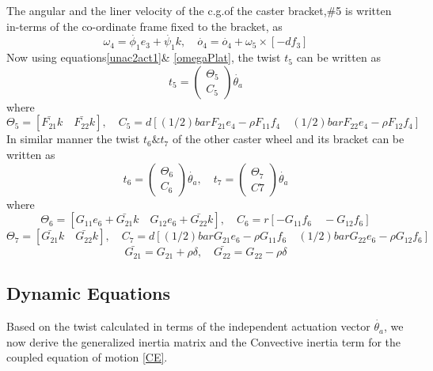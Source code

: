 The angular and the liner velocity of the c.g.of the caster bracket,\#5 is  written in-terms of the co-ordinate frame fixed to the bracket, as
\begin{equation}
\omega_4=\dot{\phi_1}e_3+\dot{\psi_1}k, \quad
\dot{o_4}=\dot{o_4}+\omega_5\times [-df_3]
\end{equation}
Now using equations\ref{unac2act1}\& \ref{omegaPlat}, the twist $t_5$ can be written as
\begin{equation}
\label{twist5}
t_5=\begin{pmatrix}
\Theta_5\\C_5
\end{pmatrix}\dot{\theta_a}
\end{equation}
where
\[ \Theta_5=[\bar{F_{21}}k \quad \bar{F_{22}}k],\quad 
C_5=d[(1/2)bar{F_{21}}e_4-\rho F_{11}f_4 \quad (1/2)bar{F_{22}}e_4-\rho F_{12}f_4]\]
In similar manner the twist $t_6 \& t_7$  of the other caster wheel and its bracket can be written as 
\begin{equation}
\label{twist6}
t_6=\begin{pmatrix}
\Theta_6\\C_6
\end{pmatrix}\dot{\theta_a}, \quad t_7=\begin{pmatrix}
\Theta_7\\C7
\end{pmatrix}\dot{\theta_a}
\end{equation}
where
\[ \Theta_6=[G_{11}e_6+\bar{G_{21}}k \quad G_{12}e_6+\bar{G_{22}}k],\quad 
C_6=r[-G_{11}f_6 \quad -G_{12}f_6]\]
\[ \Theta_7=[\bar{G_{21}}k \quad \bar{G_{22}}k],\quad 
C_7=d[(1/2)bar{G_{21}}e_6-\rho G_{11}f_6 \quad (1/2)bar{G_{22}}e_6-\rho G_{12}f_6]\]
\[\bar{G_{21}}=G_{21}+\rho \delta, \quad \bar{G_{22}}=G_{22}-\rho\delta\] 

\subsection*{Dynamic Equations}
Based on the twist calculated in terms of the independent actuation vector $\dot{\theta_a}$, we now derive the generalized inertia matrix and the Convective inertia term for the coupled equation of motion \ref{CE}.
